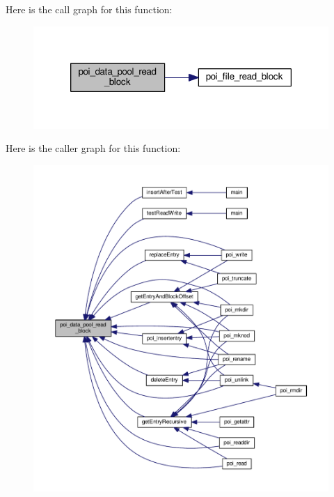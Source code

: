 Here is the call graph for this function\-:
\nopagebreak
\begin{figure}[H]
\begin{center}
\leavevmode
\includegraphics[width=318pt]{data-pool-block-manager_8h_ac930ae4a4b3ca65a49d45c7654f15149_cgraph}
\end{center}
\end{figure}




Here is the caller graph for this function\-:
\nopagebreak
\begin{figure}[H]
\begin{center}
\leavevmode
\includegraphics[width=350pt]{data-pool-block-manager_8h_ac930ae4a4b3ca65a49d45c7654f15149_icgraph}
\end{center}
\end{figure}


